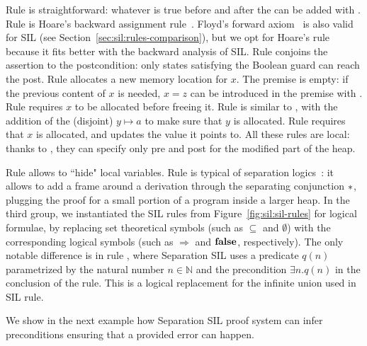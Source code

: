 Rule  is straightforward: whatever is true before and after the  can be added with .
Rule  is Hoare's backward assignment rule~\cite{Hoare69}. Floyd's forward axiom~\cite{Floyd67} is also valid for SIL (see Section~\ref{sec:sil:rules-comparison}), but we opt for Hoare's rule because it fits better with the backward analysis of SIL.
Rule  conjoins the assertion  to the postcondition: only states satisfying the Boolean guard can reach the post.
Rule  allocates a new memory location for $x$. The premise is empty: if the previous content of $x$ is needed, $x = z$ can be introduced in the premise with .
Rule  requires $x$ to be allocated before freeing it.
Rule  is similar to , with the addition of the (disjoint) $y \mapsto a$ to make sure that $y$ is allocated.
Rule  requires that $x$ is allocated, and updates the value it points to.
All these rules are local: thanks to , they can specify only pre and post for the modified part of the heap.

Rule  allows to ``hide" local variables.
Rule  is typical of separation logics~\cite{Reynolds02,RBDDOV20}: it allows to add a frame around a derivation through the separating conjunction $*$, plugging the proof for a small portion of a program inside a larger heap.
In the third group, we instantiated the SIL rules from Figure~\ref{fig:sil:sil-rules} for logical formulae, by replacing set theoretical symbols (such as $\subseteq$ and $\emptyset$) with the corresponding logical symbols (such as $\Rightarrow$ and $\textbf{false}$, respectively). The only notable difference is in rule , where Separation SIL uses a predicate $q(n)$ parametrized by the natural number $n \in \mathbb{N}$ and the precondition $\exists n. q(n)$ in the conclusion of the rule. This is a logical replacement for the infinite union used in SIL rule.

We show in the next example how Separation SIL proof system can infer preconditions ensuring that a provided error can happen.

